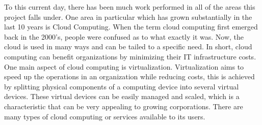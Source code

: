 


To this current day, there has been much work performed in all of the areas this project falls under. One area in particular which has grown substantially in the last 10 years is Cloud Computing. When the term cloud computing first emerged back in the 2000's, people were confused as to what exactly it was. Now, the cloud is used in many ways and can be tailed to a specific need. In short, cloud computing can benefit organizations by minimizing their IT infrastructure costs. One main aspect of cloud computing is virtualization. Virtualization aims to speed up the operations in an organization while reducing costs, this is achieved by splitting physical components of a computing device into several virtual devices. These virtual devices can be easily managed and scaled, which is a characteristic that can be very appealing to growing corporations. There are many types of cloud computing or services available to its users.

